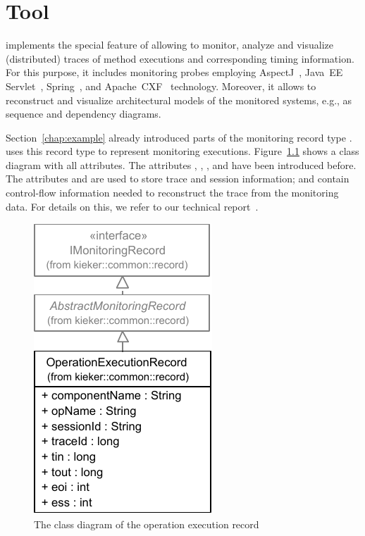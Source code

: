 % 

\chapter{\KiekerTraceAnalysis{} Tool}\label{chap:aspectJ}


\KiekerTraceAnalysis{} implements the special feature of \Kieker{} allowing to %
monitor, analyze and visualize (distributed) traces of method executions and %
corresponding timing information. For this purpose, it includes monitoring probes employing %
AspectJ~\cite{AspectJ-WebSite}, Java~EE Servlet~\cite{JavaServletTechnology-WebSite}, %
Spring~\cite{Spring-WebSite}, and Apache~CXF~\cite{CXF-WebSite} technology. %
Moreover, it allows to reconstruct and visualize architectural models of the %
monitored systems, e.g., as sequence and dependency diagrams. %

Section~\ref{chap:example} already introduced parts of the monitoring record %
type . \KiekerTraceAnalysis{} uses this record %
type to represent monitoring executions. Figure~\ref{fig:OperationExecutionRecordClassDiagramComplete} shows a class diagram %
with all attributes. The attributes , , %
, and  have been introduced before. %
The attributes  and  are used to store %
trace and session information;  and  contain control-flow %
information needed to reconstruct the trace from the monitoring data. %
For details on this, we refer to our technical %
report~\cite{vanHoornRohrHasselbringWallerEhlersFreyKieselhorst2009TRContinuousMonitoringOfSoftwareServicesDesignAndApplicationOfTheKiekerFramework}.

\begin{figure}[hb]\centering
\includegraphics[scale=0.8]{images/kieker_OperationExecutionRecord-complete-modified}%
\caption{The class diagram of the operation execution record}
\label{fig:OperationExecutionRecordClassDiagramComplete}
\end{figure}

